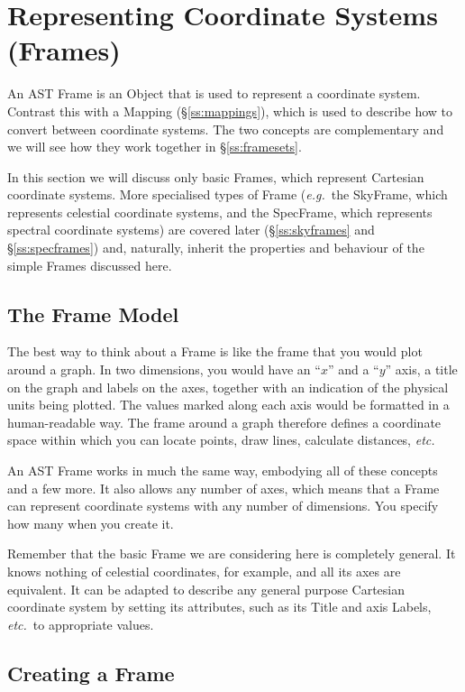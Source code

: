 \documentclass[twoside,11pt]{article}
\newcommand{\secref}[1]{\S\ref{#1}}
\newcommand{\secref}[1]{\ref{#1}}
\begin{document}
\cleardoublepage
\section{\label{ss:frames}Representing Coordinate Systems (Frames)}

An AST Frame is an Object that is used to represent a coordinate
system. Contrast this with a Mapping (\secref{ss:mappings}), which is
used to describe how to convert between coordinate systems. The two
concepts are complementary and we will see how they work together in
\secref{ss:framesets}.

In this section we will discuss only basic Frames, which represent
Cartesian coordinate systems. More specialised types of Frame
({\em{e.g.}}\ the SkyFrame, which represents celestial coordinate
systems, and the SpecFrame, which represents spectral coordinate
systems) are covered later (\secref{ss:skyframes} and \secref{ss:specframes})
and, naturally, inherit the properties and behaviour of the simple Frames
discussed here.

\subsection{The Frame Model}

The best way to think about a Frame is like the frame that you would
plot around a graph. In two dimensions, you would have an ``$x$'' and
a ``$y$'' axis, a title on the graph and labels on the axes, together
with an indication of the physical units being plotted. The values
marked along each axis would be formatted in a human-readable way. The
frame around a graph therefore defines a coordinate space within which
you can locate points, draw lines, calculate distances, {\em{etc.}}

An AST Frame works in much the same way, embodying all of these
concepts and a few more. It also allows any number of axes, which
means that a Frame can represent coordinate systems with any number of
dimensions. You specify how many when you create it.

Remember that the basic Frame we are considering here is completely
general.  It knows nothing of celestial coordinates, for example, and
all its axes are equivalent. It can be adapted to describe any general
purpose Cartesian coordinate system by setting its attributes, such as
its Title and axis Labels, {\em{etc.}}\ to appropriate values.

\subsection{\label{ss:creatingframes}Creating a Frame}
\end{document}
